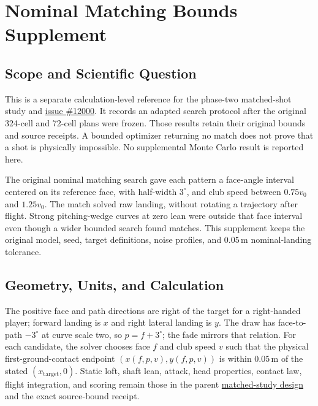 \documentclass[
]{article}
\author{}
\date{}
\begin{document}
\section{Nominal Matching Bounds
Supplement}\label{nominal-matching-bounds-supplement}

\subsection{Scope and Scientific
Question}\label{scope-and-scientific-question}

This is a separate calculation-level reference for the phase-two
matched-shot study and
\href{https://github.com/D-sorganization/UpstreamDrift/issues/12000}{issue
\#12000}. It records an adapted search protocol after the original
324-cell and 72-cell plans were frozen. Those results retain their
original bounds and source receipts. A bounded optimizer returning no
match does not prove that a shot is physically impossible. No
supplemental Monte Carlo result is reported here.

The original nominal matching search gave each pattern a face-angle
interval centered on its reference face, with half-width \(3^\circ\),
and club speed between \(0.75v_0\) and \(1.25v_0\). The match solved raw
landing, without rotating a trajectory after flight. Strong
pitching-wedge curves at zero lean were outside that face interval even
though a wider bounded search found matches. This supplement keeps the
original model, seed, target definitions, noise profiles, and
\(0.05\,\mathrm{m}\) nominal-landing tolerance.

\subsection{Geometry, Units, and
Calculation}\label{geometry-units-and-calculation}

The positive face and path directions are right of the target for a
right-handed player; forward landing is \(x\) and right lateral landing
is \(y\). The draw has face-to-path \(-3^\circ\) at curve scale two, so
\(p=f+3^\circ\); the fade mirrors that relation. For each candidate, the
solver chooses face \(f\) and club speed \(v\) such that the physical
first-ground-contact endpoint \((x(f,p,v),y(f,p,v))\) is within
\(0.05\,\mathrm{m}\) of the stated \((x_\mathrm{target},0)\). Static
loft, shaft lean, attack, head properties, contact law, flight
integration, and scoring remain those in the parent
\href{DESIGN.md}{matched-study design} and the exact source-bound
receipt.
\end{document}
